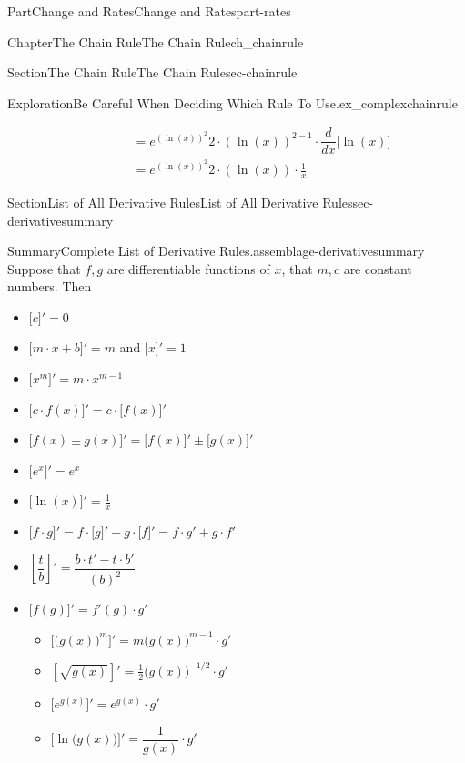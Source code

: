 \documentclass[oneside,10pt,]{tufte-book}
\numberwithin{equation}{chapter}
\newcommand{\ddx}[1]{ \dfrac{d}{dx} \Big[ #1 \Big]  }
\newcommand{\D}[1]{ \Big[ #1 \Big]'  }
\newcommand{\amp}{&}
\begin{document}
\begin{partptx}{Part}{Change and Rates}{}{Change and Rates}{}{}{part-rates}
\begin{chapterptx}{Chapter}{The Chain Rule}{}{The Chain Rule}{}{}{ch_chainrule}
\begin{sectionptx}{Section}{The Chain Rule}{}{The Chain Rule}{}{}{sec-chainrule}
\begin{exploration}{Exploration}{Be Careful When Deciding Which Rule To Use.}{ex_complexchainrule}
\begin{enumerate}[font=\bfseries,label=(\alph*),ref=\alph*]
\begin{align*}
\phantom{f'(x) } \amp = {e^{{(\ln(x))^2}}} 2\cdot  {(\ln(x))^{2-1}}\cdot \ddx{\ln(x)}\\
\amp = {e^{{(\ln(x))^2}}} 2\cdot  {(\ln(x))}\cdot \frac{1}{x}
\end{align*}
%
\end{enumerate}%
\end{exploration}%
\end{sectionptx}
%
%
\typeout{************************************************}
\typeout{************************************************}
%
\begin{sectionptx}{Section}{List of All Derivative Rules}{}{List of All Derivative Rules}{}{}{sec-derivativesummary}
\begin{assemblage}{Summary}{Complete List of Derivative Rules.}{assemblage-derivativesummary}%
Suppose that \(f,g\) are differentiable functions of \(x\), that \(m,c\) are constant numbers.  Then%
\begin{itemize}[label=\textbullet]
\item{}\(\displaystyle \D{c}=0\)%
\item{}\(\D{m\cdot x+b}=m\) and \(\D{x} = 1\)%
\item{}\(\displaystyle \D{x^m}=m\cdot x^{m-1}\)%
\item{}\(\displaystyle \D{ c\cdot f(x)}=c\cdot \D{f(x)}\)%
\item{}\(\displaystyle \D{f(x) \pm g(x)} = \D{f(x)} \pm \D{g(x)}\)%
\item{}\(\displaystyle \D{ e^x } = e^x \)%
\item{}\(\displaystyle \D{ \ln(x) } = \frac{1}{x}\)%
\item{}\(\displaystyle \Big[f\cdot g\Big]' = f\cdot \Big[g\Big]' + g\cdot \Big[f\Big]' = f\cdot g' + g\cdot f' \)%
\item{}\(\displaystyle \left[\dfrac{t}{b}\right]' = \dfrac{b\cdot t' - t\cdot b'}{(b)^2} \)%
\item{}\(\D{ f(g) } = f'(g)\cdot g'\)%
\begin{itemize}[label=$\circ$]
\item{}\(\displaystyle \D{ \big(g(x)\big)^m } = m \big(g(x)\big)^{m-1}\cdot g'\)%
\item{}\(\displaystyle \left[ \sqrt{g(x)} \right]' = \frac{1}{2}\Big( g(x) \Big)^{-1/2}\cdot g' \)%
\item{}\(\displaystyle \D{ e^{g(x)} } = e^{g(x)}\cdot g'\)%
\item{}\(\displaystyle \D{ \ln\big(g(x)\big) } = \dfrac{1}{g(x)}\cdot g'\)%

\end{itemize}
\end{itemize}
\end{assemblage}
\end{sectionptx}
\end{chapterptx}
\end{partptx}
\end{document}

